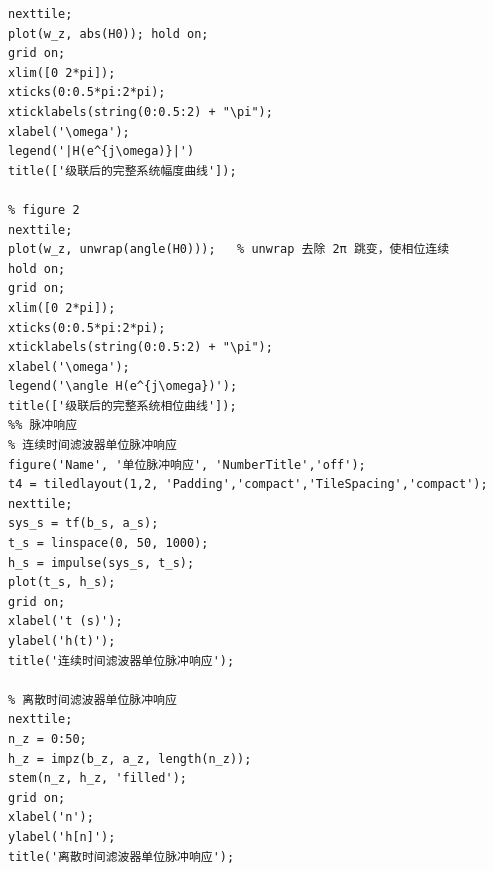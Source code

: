 \documentclass[UTF8,12pt,a4paper]{ctexart}
\begin{document}
\begin{lstlisting}
nexttile; 
plot(w_z, abs(H0)); hold on;
grid on; 
xlim([0 2*pi]);
xticks(0:0.5*pi:2*pi);
xticklabels(string(0:0.5:2) + "\pi");
xlabel('\omega'); 
legend('|H(e^{j\omega)}|')
title(['级联后的完整系统幅度曲线']);

% figure 2
nexttile; 
plot(w_z, unwrap(angle(H0)));   % unwrap 去除 2π 跳变，使相位连续
hold on;
grid on; 
xlim([0 2*pi]);
xticks(0:0.5*pi:2*pi);
xticklabels(string(0:0.5:2) + "\pi");
xlabel('\omega'); 
legend('\angle H(e^{j\omega})'); 
title(['级联后的完整系统相位曲线']);
%% 脉冲响应
% 连续时间滤波器单位脉冲响应
figure('Name', '单位脉冲响应', 'NumberTitle','off');
t4 = tiledlayout(1,2, 'Padding','compact','TileSpacing','compact');
nexttile;
sys_s = tf(b_s, a_s);
t_s = linspace(0, 50, 1000);
h_s = impulse(sys_s, t_s);
plot(t_s, h_s);
grid on;
xlabel('t (s)');
ylabel('h(t)');
title('连续时间滤波器单位脉冲响应');

% 离散时间滤波器单位脉冲响应
nexttile;
n_z = 0:50;
h_z = impz(b_z, a_z, length(n_z));
stem(n_z, h_z, 'filled');
grid on;
xlabel('n');
ylabel('h[n]');
title('离散时间滤波器单位脉冲响应');
\end{lstlisting}
\end{document}
